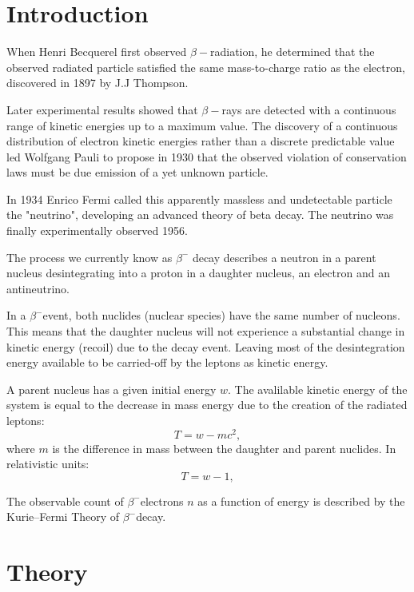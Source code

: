 \documentclass[10pt, a4paper]{article}
\begin{document}
\section{Introduction}
\begin{multicols}{2}
When Henri Becquerel first observed $\beta-$radiation, he determined that the observed radiated particle satisfied the same mass-to-charge ratio as the electron, discovered in 1897 by J.J Thompson\cite{Wikipedia-particle}. 

Later experimental results showed that $\beta-$rays are detected with a continuous range of kinetic energies up to a maximum value\cite{SMM}. 
The discovery of a continuous distribution of electron kinetic energies rather than a discrete predictable value led Wolfgang Pauli to propose in 1930 that the observed violation of conservation laws must be due emission of a yet unknown particle.

In 1934 Enrico Fermi called this apparently massless and undetectable particle the "neutrino", developing an advanced theory of beta decay. The neutrino was finally experimentally observed 1956.\cite{Nave-beta} 

The process we currently know as $\beta^{-}$ decay describes a neutron in a parent nucleus desintegrating into a proton in a daughter nucleus, an electron and an antineutrino.

In a $\beta^{-}$event, both nuclides (nuclear species) have the same number of nucleons. This means that the daughter nucleus will not experience a substantial change in kinetic energy (recoil) due to the decay event. Leaving most of the desintegration energy available to be carried-off by the leptons as kinetic energy. 

A parent nucleus has a given initial energy $w$. 
The avalilable kinetic energy of the system is equal to the decrease in mass energy due to the creation of the radiated leptons:
\begin{equation}T = w - m c^2,
\end{equation} where $m$ is the difference in mass between the daughter and parent nuclides.
In relativistic units:
\begin{equation}T = w - 1,
\end{equation}

The observable count of $\beta^{-}$electrons $n$ as a function of energy is described by the Kurie--Fermi Theory of $\beta^{-}$decay.

\section{Theory}


\end{multicols}
\end{document}
